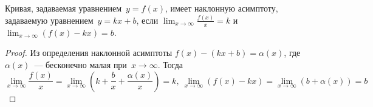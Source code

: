 \begin{theorem}
Кривая, задаваемая уравнением~$y = f(x)$, имеет наклонную асимптоту, задаваемую уравнением~$y = kx + b$, если $\displaystyle \lim_{x \to \infty} \frac{f(x)}x = k$ и $\displaystyle \lim_{x \to \infty} (f(x) - kx) = b$.
\end{theorem}
\begin{proof}
Из определения наклонной асимптоты $f(x) - (kx + b) = \alpha(x)$, где $\alpha(x)$~--- бесконечно малая при~$x \to \infty$.
Тогда
\begin{equation*}
\lim_{x \to \infty} \frac{f(x)}x =
\lim_{x \to \infty} \left( k + \frac{b}x + \frac{\alpha(x)}x \right) =
k, \
\lim_{x \to \infty} (f(x) - kx) =
\lim_{x \to \infty} (b + \alpha(x)) =
b
\end{equation*}
\end{proof}